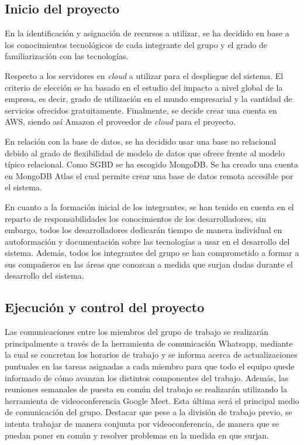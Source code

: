 \documentclass{article}
\begin{document}
\subsection{Inicio del proyecto}

En la identificación y asignación de recursos a utilizar, se ha decidido en base a los conocimientos tecnológicos de cada integrante del grupo y el grado de familiarización con las tecnologías. 

Respecto a los servidores en \textit{cloud} a utilizar para el despliegue del sistema. El criterio de elección se ha basado en el estudio del impacto a nivel global de la empresa, es decir, grado de utilización en el mundo empresarial y la cantidad de servicios ofrecidos gratuitamente. Finalmente, se decide crear una cuenta en AWS, siendo así Amazon el proveedor de \textit{cloud} para el proyecto.

En relación con la base de datos, se ha decidido usar una base no relacional debido al grado de flexibilidad de modelo de datos que ofrece frente al modelo típico relacional. Como SGBD se ha escogido MongoDB. Se ha creado una cuenta en MongoDB Atlas el cual permite crear una base de datos remota accesible
por el sistema.

En cuanto a la formación inicial de los integrantes, se han tenido en cuenta en el reparto de responsabilidades los conocimientos de los desarrolladores, sin embargo, todos los desarrolladores dedicarán tiempo de manera individual en autoformación y documentación sobre las tecnologías a usar en el desarrollo del sistema. Además, todos los integrantes del grupo se han comprometido a formar a sus compañeros en las áreas que conozcan a medida que surjan dudas durante el desarrollo del sistema.

\subsection{Ejecución y control del proyecto}

Las comunicaciones entre los miembros del grupo de trabajo se realizarán principalmente a través de la herramienta de comunicación Whatsapp, mediante la cual se concretan los horarios de trabajo y se informa acerca de actualizaciones puntuales en las tareas asignadas a cada miembro para que todo el equipo quede informado de cómo avanzan los distintos componentes del trabajo. Además, las reuniones semanales de puesta en común del trabajo se realizarán utilizando la herramienta de videoconferencia Google Meet. Esta última será el principal medio de comunicación del grupo. Destacar que pese a la división de trabajo previo, se intenta trabajar de manera conjunta por videoconferencia, de manera que se puedan poner en común y resolver problemas en la medida en que surjan.
\end{document}
